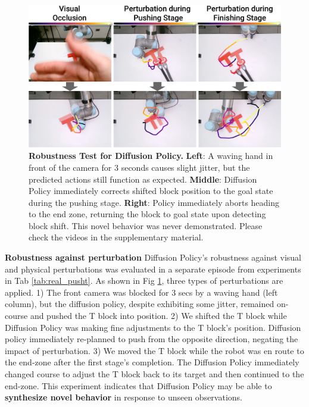 \documentclass[Afour,sageh,times]{sagej}
\begin{document}
\begin{figure}[t]
\centering
\includegraphics[width=\linewidth]{figure/real_robustness.pdf}

\caption{\textbf{Robustness Test for Diffusion Policy.}
\label{fig:robustness}
\textbf{Left}: A waving hand in front of the camera for 3 seconds causes slight jitter, but the predicted actions still function as expected.
\textbf{Middle}: Diffusion Policy immediately corrects shifted block position to the goal state during the pushing stage.
\textbf{Right}: Policy immediately aborts heading to the end zone, returning the block to goal state upon detecting block shift. This novel behavior was never demonstrated.
Please check the videos in the supplementary material. }

\vspace{-4mm}
\end{figure}

\textbf{Robustness against perturbation}
Diffusion Policy's robustness against visual and physical perturbations was evaluated in a separate episode from experiments in Tab \ref{tab:real_pusht}. As shown in Fig \ref{fig:robustness}, three types of perturbations are applied.
1) The front camera was blocked for 3 secs by a waving hand (left column), but the diffusion policy, despite exhibiting some jitter, remained on-course and pushed the T block into position.
2) We shifted the T block while Diffusion Policy was making fine adjustments to the T block's position. Diffusion policy immediately re-planned to push from the opposite direction, negating the impact of perturbation.
3) We moved the T block while the robot was en route to the end-zone after the first stage's completion. The Diffusion Policy immediately changed course to adjust the T block back to its target and then continued to the end-zone. This experiment indicates that Diffusion Policy may be able to \textbf{synthesize novel behavior} in response to unseen observations.
\end{document}
